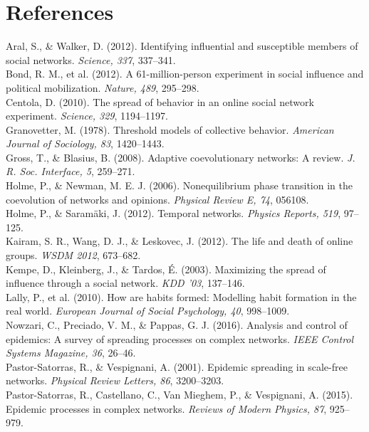 \documentclass[11pt]{article}
\begin{document}
\section*{References}
\begin{flushleft}\small
Aral, S., \& Walker, D. (2012). Identifying influential and susceptible members of social networks. \textit{Science, 337}, 337--341.\\[2pt]
Bond, R. M., et al. (2012). A 61-million-person experiment in social influence and political mobilization. \textit{Nature, 489}, 295--298.\\[2pt]
Centola, D. (2010). The spread of behavior in an online social network experiment. \textit{Science, 329}, 1194--1197.\\[2pt]
Granovetter, M. (1978). Threshold models of collective behavior. \textit{American Journal of Sociology, 83}, 1420--1443.\\[2pt]
Gross, T., \& Blasius, B. (2008). Adaptive coevolutionary networks: A review. \textit{J. R. Soc. Interface, 5}, 259--271.\\[2pt]
Holme, P., \& Newman, M. E. J. (2006). Nonequilibrium phase transition in the coevolution of networks and opinions. \textit{Physical Review E, 74}, 056108.\\[2pt]
Holme, P., \& Saram\"aki, J. (2012). Temporal networks. \textit{Physics Reports, 519}, 97--125.\\[2pt]
Kairam, S. R., Wang, D. J., \& Leskovec, J. (2012). The life and death of online groups. \textit{WSDM 2012}, 673--682.\\[2pt]
Kempe, D., Kleinberg, J., \& Tardos, \'E. (2003). Maximizing the spread of influence through a social network. \textit{KDD '03}, 137--146.\\[2pt]
Lally, P., et al. (2010). How are habits formed: Modelling habit formation in the real world. \textit{European Journal of Social Psychology, 40}, 998--1009.\\[2pt]
Nowzari, C., Preciado, V. M., \& Pappas, G. J. (2016). Analysis and control of epidemics: A survey of spreading processes on complex networks. \textit{IEEE Control Systems Magazine, 36}, 26--46.\\[2pt]
Pastor-Satorras, R., \& Vespignani, A. (2001). Epidemic spreading in scale-free networks. \textit{Physical Review Letters, 86}, 3200--3203.\\[2pt]
Pastor-Satorras, R., Castellano, C., Van Mieghem, P., \& Vespignani, A. (2015). Epidemic processes in complex networks. \textit{Reviews of Modern Physics, 87}, 925--979.\\[2pt]

\end{flushleft}
\end{document}
